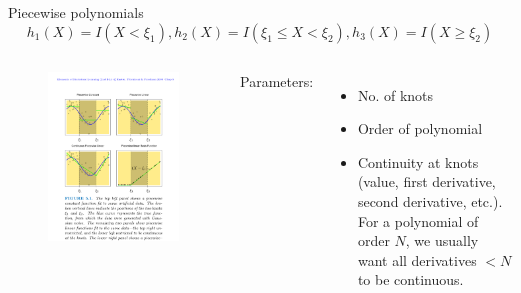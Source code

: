 \documentclass[aspectratio=169]{beamer}
\begin{document}
\begin{frame}{Piecewise polynomials}
    \begin{equation*}
        h_1(X) = I(X < \xi_1), h_2(X) = I(\xi_1 \leq X < \xi_2), h_3(X) = I(X \geq \xi_2)
    \end{equation*}
    \begin{columns}
    \begin{figure}
        \centering
        \includegraphics[width=\textwidth]{figures/piecewisefits.pdf}
    \end{figure}
    Parameters:
    \begin{itemize}
        \item No. of knots
        \item Order of polynomial
        \item Continuity at knots (value, first derivative, second derivative, etc.). For a polynomial of order $N$, we usually want all derivatives $< N$ to be continuous. 
    \end{itemize}
    \end{columns}
\end{frame} 
\end{document}
